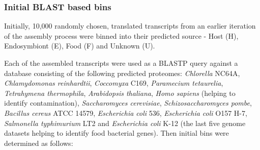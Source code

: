\subsubsection{Initial BLAST based bins}

Initially, 10,000 randomly chosen, translated transcripts from an earlier iteration
of the assembly process were binned into their predicted source - 
Host (H), Endosymbiont (E), Food (F) and Unknown (U).  


Each of the assembled transcripts were used as a BLASTP query against a database consisting of the following predicted proteomes: 
\textit{Chlorella} NC64A, \textit{Chlamydomonas reinhardtii}, \textit{Coccomyxa} C169,
\textit{Paramecium tetaurelia}, \textit{Tetrahymena thermophila}, \textit{Arabidopsis thaliana}, \textit{Homo sapiens} (helping to identify contamination), \textit{Saccharomyces cerevisiae}, \textit{Schizosaccharomyces pombe}, \textit{Bacillus
cereus} ATCC 14579, \textit{Escherichia coli} 536, \textit{Escherichia coli} O157 H-7, \textit{Salmonella typhimurium}
LT2 and \textit{Escherichia coli} K-12 (the last five genome datasets helping to identify food bacterial
genes). Then initial bins were determined as follows:
